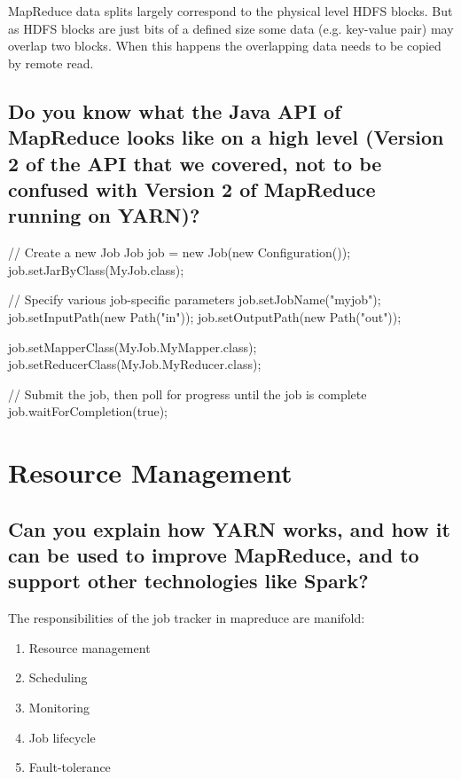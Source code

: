 \documentclass{article}
\begin{document}
MapReduce data splits largely correspond to the physical level HDFS blocks. But as HDFS blocks are just bits of a defined size some data (e.g. key-value pair) may overlap two blocks. When this happens the overlapping data needs to be copied by remote read. 

\subsection{Do you know what the Java API of MapReduce looks like on a high level (Version 2 of the API that we covered, not to be confused with Version 2 of MapReduce running on YARN)?}


\begin{center}
\begin{listing}[H]
  \begin{java}
    // Create a new Job
    Job job = new Job(new Configuration());
    job.setJarByClass(MyJob.class);
    
    // Specify various job-specific parameters
    job.setJobName("myjob");
    job.setInputPath(new Path("in"));
    job.setOutputPath(new Path("out"));
    
    job.setMapperClass(MyJob.MyMapper.class);
    job.setReducerClass(MyJob.MyReducer.class);
    
    // Submit the job, then poll for progress until the job is complete
    job.waitForCompletion(true);
  \end{java}
\end{listing}
\end{center}


\section{Resource Management}



\subsection{Can you explain how YARN works, and how it can be used to improve MapReduce, and to support other technologies like Spark?}

The responsibilities of the job tracker in mapreduce are manifold:

\begin{enumerate}
\item Resource management
\item Scheduling
\item Monitoring
\item Job lifecycle
\item Fault-tolerance
\end{enumerate}
\end{document}
